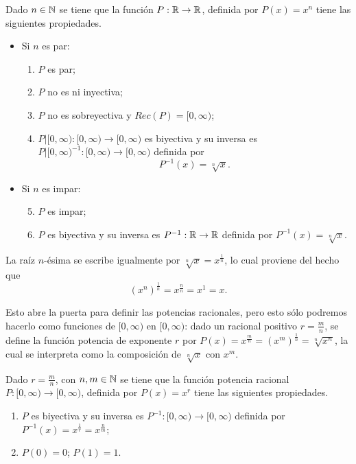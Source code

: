 \vspace{.2cm}


\begin{prop}
Dado $n\in\mathbb{N}$ se tiene que la función  $P:\mathbb{R}\rightarrow\mathbb{R}$, definida por $P(x)=x^n$ tiene las siguientes propiedades.
\begin{itemize}
\item Si $n$ es par: 
\begin{enumerate}
\item $P$ es par;
\item $P$ no es ni inyectiva;
\item $P$ no es sobreyectiva y $Rec(P)=[0,\infty)$;
\item $P|[0,\infty):[0,\infty)\rightarrow[0,\infty)$ es biyectiva y su inversa es $P|[0,\infty)^{-1}:[0,\infty)\rightarrow[0,\infty)$ definida por $$P^{-1}(x)=\sqrt[n]{x}.$$
\end{enumerate}
\item Si $n$ es impar:
\begin{enumerate}\setcounter{enumi}{4}
\item $P$ es impar;
\item $P$ es biyectiva y su inversa es $P^{-1}:\mathbb{R}\rightarrow \mathbb{R}$ definida por $P^{-1}(x)=\sqrt[n]{x}$.
\end{enumerate}
\end{itemize}
\end{prop}

La raíz $n$-ésima se escribe igualmente por $\sqrt[n]{x}=x^{\frac{1}{n}}$, lo cual proviene del hecho que $$(x^n)^{\frac{1}{n}}=x^{\frac{n}{n}}=x^1=x.$$

Esto abre la puerta para definir las potencias racionales, pero esto sólo podremos hacerlo como funciones de $[0,\infty)$ en $[0,\infty)$: dado un racional positivo $r=\frac{m}{n}$, se define la función potencia de exponente $r$ por $P(x)=x^{\frac{m}{n}}=(x^m)^{\frac{1}{n}}=\sqrt[n]{x^n}$, la cual se interpreta como la composición de $\sqrt[n]{x}$ con $x^m$.

\vspace{.2cm}


\begin{prop}
Dado $r=\frac{m}{n}$, con $n,m\in \mathbb{N}$ se tiene que la función potencia racional $P:[0,\infty)\rightarrow[0,\infty)$, definida por $P(x)=x^r$ tiene las siguientes propiedades.

\begin{enumerate}
\item $P$ es biyectiva y su inversa es $P^{-1}:[0,\infty)\rightarrow[0,\infty)$ definida por $P^{-1}(x)=x^{\frac{1}{r}}=x^{\frac{n}{m}}$;
\item $P(0)=0$;  $P(1)=1$.
\end{enumerate}
\end{prop}

